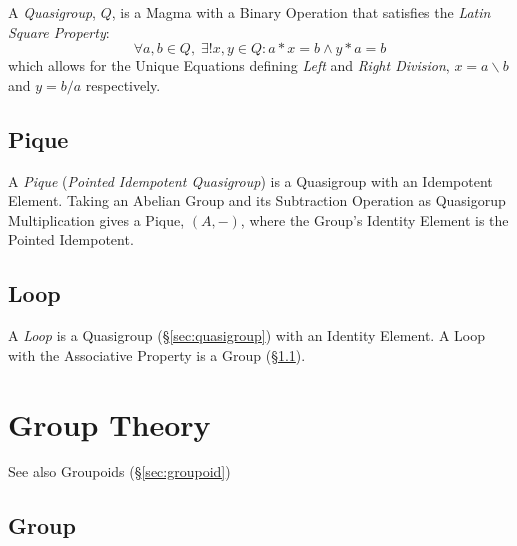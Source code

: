 A \emph{Quasigroup}, $Q$, is a Magma with a Binary Operation that satisfies
the \emph{Latin Square Property}:
\[
  \forall a, b \in Q,\;\exists ! x,y \in Q : a * x = b \wedge y * a = b
\]
which allows for the Unique Equations defining \emph{Left} and
\emph{Right Division}, $x = a \backslash b$ and $y = b / a$
respectively.



\subsection{Pique}\label{sec:pique}

A \emph{Pique} (\emph{Pointed Idempotent Quasigroup}) is a Quasigroup
with an Idempotent Element. Taking an Abelian Group and its
Subtraction Operation as Quasigorup Multiplication gives a Pique,
$(A,-)$, where the Group's Identity Element is the Pointed Idempotent.



\subsection{Loop}\label{sec:quasigroup_loop}

A \emph{Loop} is a Quasigroup (\S\ref{sec:quasigroup}) with an
Identity Element. A Loop with the Associative Property is a Group
(\S\ref{sec:group}).



\section{Group Theory}\label{sec:group_theory}

\HandRight\; See also Groupoids (\S\ref{sec:groupoid})



\subsection{Group}\label{sec:group}

